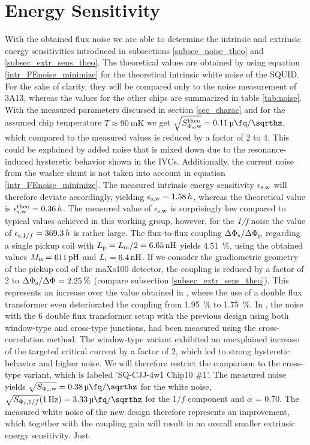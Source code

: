 \section{Energy Sensitivity}

With the obtained flux noise we are able to determine the intrinsic and extrinsic energy sensitivities introduced in subsections \ref{subsec_noise_theo} and \ref{subsec_extr_sens_theo}. The theoretical values are obtained by using equation \ref{intr_FEnoise_minimize} for the theoretical intrinsic white noise of the SQUID. For the sake of clarity, they will be compared only to the noise measurement of 3A13, whereas the values for the other chips are summarized in table \ref{tab:noise}. With the measured parameters discussed in section \ref{sec_charac} and for the assumed chip temperature $T\approx \qty{90}{\milli\kelvin}$ we get $\sqrt{S_{\rm \Phi_{\rm s},w}^{\rm theo}}=\qty{0.11}{\micro\fq\per\sqrthz}$, which compared to the measured values is reduced by a factor of 2 to 4. This could be explained by added noise that is mixed down due to the resonance-induced hysteretic behavior shown in the IVCs. Additionally, the current noise from the washer shunt is not taken into account in equation \ref{intr_FEnoise_minimize}. The measured intrinsic energy sensitivity $\epsilon_{\rm s,w}$ will therefore deviate accordingly, yielding $\epsilon_{\rm s,w}=1.58\, h$, whereas the theoretical value is $\epsilon_{\rm s,w}^{\rm theo}=0.36\, h$. The measured value of $\epsilon_{\rm s,w}$ is surprisingly low compared to typical values achieved in this working group, however, for the \textit{1/f} noise the value of $\epsilon_{{\rm s},1/f}=369.3\, h$ is rather large. The flux-to-flux coupling $\Delta\Phi_{\rm s}/\Delta\Phi_{\rm p}$ regarding a single pickup coil with $L_{\rm p}=L_{\rm m}/2=\qty{6.65}{\nH}$ yields \qty{4.51}{\percent}, using the obtained values $M_{\rm is}=\qty{611}{\pH}$ and  $L_{\rm i}=\qty{6.4}{\nH}$. If we consider the gradiometric geometry of the pickup coil of the maXs100 detector, the coupling is reduced by a factor of 2 to $\Delta\Phi_{\rm s}/\Delta\Phi_{\rm }=\qty{2.25}{\percent}$ (compare subsection \ref{subsec_extr_sens_theo}). This represents an increase over the value obtained in \cite{Bauer2022}, where the use of a double flux transformer even deteriorated the coupling from \qty{1.95}{\percent} to \qty{1.75}{\percent}. In \cite{Bauer2022}, the noise with the \qty{6}{\nH} double flux transformer setup with the previous design using both window-type and cross-type junctions, had been measured using the cross-correlation method. The window-type variant exhibited an unexplained increase of the targeted critical current by a factor of 2, which led to strong hysteretic behavior and higher noise. We will therefore restrict the comparison to the cross-type variant, which is labeled 'SQ-CJJ-4w1 Chip10 $\#$1'. The measured noise yields $\sqrt{S_{\rm \Phi_{\rm s},w}}=\qty{0.38}{\micro\fq\per\sqrthz}$ for the white noise, $\sqrt{S_{\Phi_{\rm s},1/f}}(\qty{1}{\Hz})=\qty{3.33}{\micro\fq\per\sqrthz}$ for the $1/f$ component and $\alpha$ = 0.70. The measured white noise of the new design therefore represents an improvement, which together with the coupling gain will result in an overall smaller extrinsic energy sensitivity. Just 